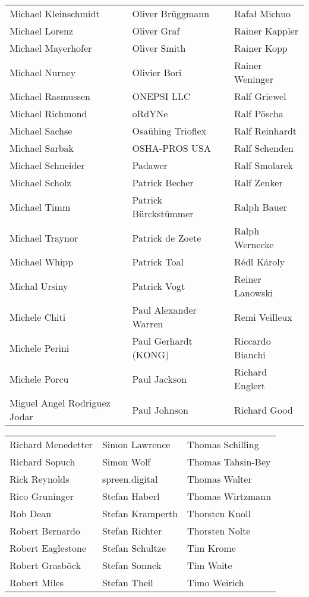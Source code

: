 \begin{small}
\begin{tabular}{p{4cm}p{4cm}p{4cm}}
Michael Kleinschmidt & Oliver Brüggmann & Rafał Michno \\
Michael Lorenz & Oliver Graf & Rainer Kappler \\
Michael Mayerhofer & Oliver Smith & Rainer Kopp \\
Michael Nurney & Olivier Bori & Rainer Weninger \\
Michael Rasmussen & ONEPSI LLC & Ralf Griewel \\
Michael Richmond & oRdYNe & Ralf Pöscha \\
Michael Sachse & Osaühing Trioflex & Ralf Reinhardt \\
Michael Sarbak & OSHA-PROS USA & Ralf Schenden \\
Michael Schneider & Padawer & Ralf Smolarek \\
Michael Scholz & Patrick Becher & Ralf Zenker \\
Michael Timm & Patrick Bürckstümmer & Ralph Bauer \\
Michael Traynor & Patrick de Zoete & Ralph Wernecke \\
Michael Whipp & Patrick Toal & Rédl Károly \\
Michal Ursiny & Patrick Vogt & Reiner Lanowski \\
Michele Chiti & Paul Alexander Warren & Remi Veilleux \\
Michele Perini & Paul Gerhardt (KONG) & Riccardo Bianchi \\
Michele Porcu & Paul Jackson & Richard Englert \\
Miguel Angel Rodriguez Jodar & Paul Johnson & Richard Good \\
\end{tabular}
\newpage
\setlength{\tabcolsep}{1mm}
\begin{tabular}{p{4cm}p{4cm}p{4cm}}
Richard Menedetter & Simon Lawrence & Thomas Schilling \\
Richard Sopuch & Simon Wolf & Thomas Tahsin-Bey \\
Rick Reynolds & spreen.digital & Thomas Walter \\
Rico Gruninger & Stefan Haberl & Thomas Wirtzmann \\
Rob Dean & Stefan Kramperth & Thorsten Knoll \\
Robert Bernardo & Stefan Richter & Thorsten Nolte \\
Robert Eaglestone & Stefan Schultze & Tim Krome \\
Robert Grasböck & Stefan Sonnek & Tim Waite \\
Robert Miles & Stefan Theil & Timo Weirich \\

\end{tabular}
\end{small}
